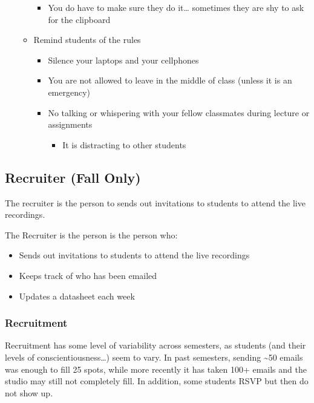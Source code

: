 \documentclass[
]{article}
\providecommand{\tightlist}{%
  \setlength{\itemsep}{0pt}\setlength{\parskip}{0pt}}
\begin{document}
\begin{itemize}
\begin{itemize}
    \begin{itemize}
    \tightlist
    \item
      You do have to make sure they do it\ldots{} sometimes they are shy to ask for the clipboard
    \end{itemize}
  \item
    Remind students of the rules

    \begin{itemize}
    \tightlist
    \item
      Silence your laptops and your cellphones
    \item
      You are not allowed to leave in the middle of class (unless it is an emergency)
    \item
      No talking or whispering with your fellow classmates during lecture or assignments

      \begin{itemize}
      \tightlist
      \item
        It is distracting to other students
      \end{itemize}
    \end{itemize}
  \end{itemize}
\end{itemize}

\hypertarget{recruiter-fall-only}{%
\subsection{Recruiter (Fall Only)}\label{recruiter-fall-only}}

The recruiter is the person to sends out invitations to students to attend the live recordings.

The Recruiter is the person is the person who:

\begin{itemize}
\tightlist
\item
  Sends out invitations to students to attend the live recordings
\item
  Keeps track of who has been emailed
\item
  Updates a datasheet each week
\end{itemize}

\hypertarget{recruitment}{%
\subsubsection{Recruitment}\label{recruitment}}

Recruitment has some level of variability across semesters, as students (and their levels of conscientiousness\ldots) seem to vary. In past semesters, sending \textasciitilde50 emails was enough to fill 25 spots, while more recently it has taken 100+ emails and the studio may still not completely fill. In addition, some students RSVP but then do not show up.
\end{document}
